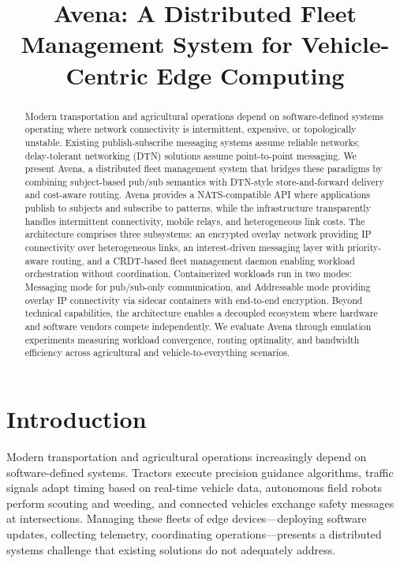 \documentclass[journal]{IEEEtran}
\title{Avena: A Distributed Fleet Management System for Vehicle-Centric Edge Computing}
\author{
}
\date{}
\begin{document}
\maketitle

\begin{abstract}
Modern transportation and agricultural operations depend on software-defined systems operating where network connectivity is intermittent, expensive, or topologically unstable. Existing publish-subscribe messaging systems assume reliable networks; delay-tolerant networking (DTN) solutions assume point-to-point messaging. We present Avena, a distributed fleet management system that bridges these paradigms by combining subject-based pub/sub semantics with DTN-style store-and-forward delivery and cost-aware routing. Avena provides a NATS-compatible API where applications publish to subjects and subscribe to patterns, while the infrastructure transparently handles intermittent connectivity, mobile relays, and heterogeneous link costs. The architecture comprises three subsystems: an encrypted overlay network providing IP connectivity over heterogeneous links, an interest-driven messaging layer with priority-aware routing, and a CRDT-based fleet management daemon enabling workload orchestration without coordination. Containerized workloads run in two modes: Messaging mode for pub/sub-only communication, and Addressable mode providing overlay IP connectivity via sidecar containers with end-to-end encryption. Beyond technical capabilities, the architecture enables a decoupled ecosystem where hardware and software vendors compete independently. We evaluate Avena through emulation experiments measuring workload convergence, routing optimality, and bandwidth efficiency across agricultural and vehicle-to-everything scenarios.
\end{abstract}

\section{Introduction}

Modern transportation and agricultural operations increasingly depend on software-defined systems. Tractors execute precision guidance algorithms, traffic signals adapt timing based on real-time vehicle data, autonomous field robots perform scouting and weeding, and connected vehicles exchange safety messages at intersections. Managing these fleets of edge devices---deploying software updates, collecting telemetry, coordinating operations---presents a distributed systems challenge that existing solutions do not adequately address.
\end{document}
